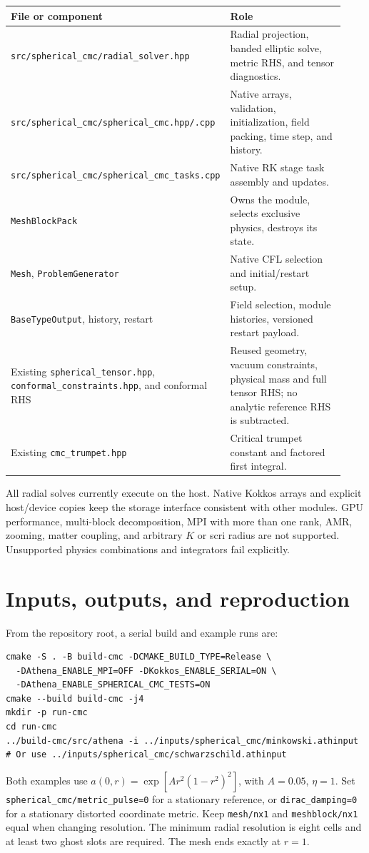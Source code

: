 \documentclass[11pt]{article}
\newcommand{\pathfile}[1]{\nolinkurl{#1}}
\begin{document}
\begin{longtable}{p{0.43\linewidth}p{0.50\linewidth}}
\toprule File or component & Role\\\midrule\endhead
\pathfile{src/spherical_cmc/radial_solver.hpp} & Radial projection, banded elliptic solve, metric RHS, and tensor diagnostics.\\
\pathfile{src/spherical_cmc/spherical_cmc.hpp/.cpp} & Native arrays, validation, initialization, field packing, time step, and history.\\
\pathfile{src/spherical_cmc/spherical_cmc_tasks.cpp} & Native RK stage task assembly and updates.\\
\pathfile{MeshBlockPack} & Owns the module, selects exclusive physics, destroys its state.\\
\pathfile{Mesh}, \pathfile{ProblemGenerator} & Native CFL selection and initial/restart setup.\\
\pathfile{BaseTypeOutput}, history, restart & Field selection, module histories, versioned restart payload.\\
Existing \pathfile{spherical_tensor.hpp}, \pathfile{conformal_constraints.hpp}, and conformal RHS & Reused geometry, vacuum constraints, physical mass and full tensor RHS; no analytic reference RHS is subtracted.\\
Existing \pathfile{cmc_trumpet.hpp} & Critical trumpet constant and factored first integral.\\\bottomrule
\end{longtable}
All radial solves currently execute on the host. Native Kokkos arrays and explicit
host/device copies keep the storage interface consistent with other modules.
GPU performance, multi-block decomposition, MPI with more than one rank, AMR,
zooming, matter coupling, and arbitrary $K$ or scri radius are not supported.
Unsupported physics combinations and integrators fail explicitly.

\section{Inputs, outputs, and reproduction}
From the repository root, a serial build and example runs are:
\begin{lstlisting}
cmake -S . -B build-cmc -DCMAKE_BUILD_TYPE=Release \
  -DAthena_ENABLE_MPI=OFF -DKokkos_ENABLE_SERIAL=ON \
  -DAthena_ENABLE_SPHERICAL_CMC_TESTS=ON
cmake --build build-cmc -j4
mkdir -p run-cmc
cd run-cmc
../build-cmc/src/athena -i ../inputs/spherical_cmc/minkowski.athinput
# Or use ../inputs/spherical_cmc/schwarzschild.athinput
\end{lstlisting}
Both examples use $a(0,r)=\exp[A r^2(1-r^2)^2]$, with $A=0.05$, $\eta=1$.
Set \pathfile{spherical_cmc/metric_pulse=0} for a stationary reference,
or \texttt{dirac\_damping=0} for a stationary distorted coordinate metric.
Keep \texttt{mesh/nx1} and \texttt{meshblock/nx1} equal when changing resolution.
The minimum radial resolution is eight cells and at least two ghost slots are
required. The mesh ends exactly at $r=1$.
\end{document}

